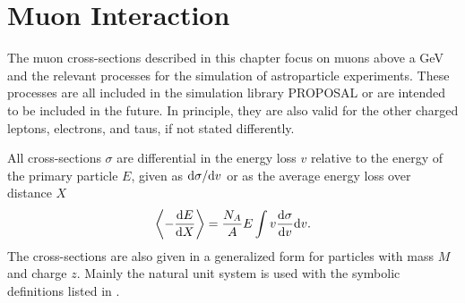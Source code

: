 \chapter{Muon Interaction} \label{sec:interactions}

The muon cross-sections described in this chapter focus on muons above a GeV and the relevant processes for the simulation of astroparticle experiments.
These processes are all included in the simulation library PROPOSAL or are intended to be included in the future.
In principle, they are also valid for the other charged leptons, electrons, and taus, if not stated differently.

All cross-sections $\sigma$ are differential in the energy loss $v$ relative to the energy of the primary particle $E$, given as $\mathrm{d} \sigma / \mathrm{d} v$ or as the average energy loss over distance $X$
\begin{align} \label{eq:dedx_int}
    \left\langle - \frac{\mathrm{d} E}{\mathrm{d} X} \right\rangle = \frac{N_A}{A} E \int v \frac{\mathrm{d} \sigma}{\mathrm{d} v} \mathrm{d} v.
\end{align}
The cross-sections are also given in a generalized form for particles with mass $M$ and charge $z$.
Mainly the natural unit system is used with the symbolic definitions listed in .
